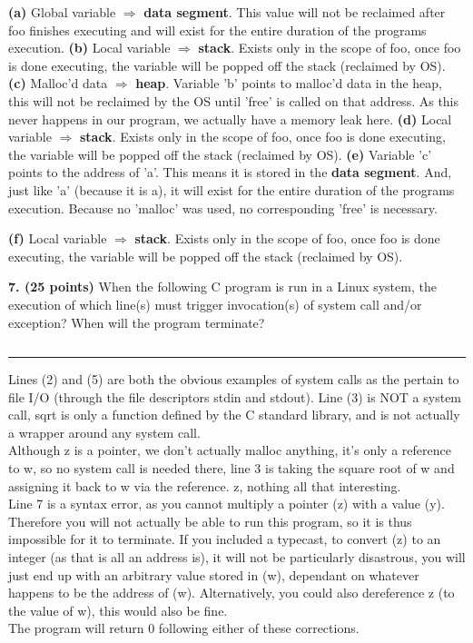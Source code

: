 \documentclass[12pt]{jhwhw}
\begin{document}
	\begin{addmargin}[1em]{}
		\textbf{(a)} Global variable $\Rightarrow$ \textbf{data segment}. This value
			will not be reclaimed after foo finishes executing and will exist
			for the entire duration of the programs execution.
		\bigbreak
		\textbf{(b)} Local variable $\Rightarrow$ \textbf{stack}. Exists only in the scope of
			foo, once foo is done executing, the variable will be popped off the stack
			(reclaimed by OS).
		\bigbreak
		\textbf{(c)} Malloc'd data $\Rightarrow$ \textbf{heap}. Variable 'b' points to malloc'd
			data in the heap, this will not be reclaimed by the OS until 'free' is 
			called on that address. As this never happens in our program, we actually
			have a memory leak here.
		\bigbreak
		\textbf{(d)} Local variable $\Rightarrow$ \textbf{stack}. Exists only in the scope of
			foo, once foo is done executing, the variable will be popped off the stack
			(reclaimed by OS).
		\bigbreak
		\textbf{(e)} Variable 'c' points to the address of 'a'. This means it is 
			stored in the \textbf{data segment}. And, just like 'a' (because it is a),
			it will exist for the entire duration of the programs execution. Because no
			'malloc' was used, no corresponding 'free' is necessary.

		\bigbreak
		\textbf{(f)} Local variable $\Rightarrow$ \textbf{stack}. Exists only in the scope of
			foo, once foo is done executing, the variable will be popped off the stack
			(reclaimed by OS).
	\end{addmargin}

\bigbreak
\textbf{7. (25 points)} When the following C program is run in a Linux system,
the execution of which line(s) must trigger invocation(s) of system call and/or exception?
When will the program terminate?
\inputminted{c}{p7.c}
\textcolor[RGB]{240,240,240}{\rule{\textwidth}{0.5pt}}\bigbreak

	\begin{addmargin}[1em]{}
		Lines (2) and (5) are both the obvious examples of system calls as the
		pertain to file I/O (through the file descriptors stdin and stdout).
		Line (3) is NOT a system call, sqrt is only a function defined by the C standard 
		library, and is not actually a wrapper around any system call. \\ \bigbreak
		Although z is a pointer, we don't actually malloc anything, it's only a reference
		to w, so no system call is needed there, line 3 is taking the square root of w
		and assigning it back to w via the reference. z, nothing all that interesting.
		\\ \bigbreak
		Line 7 is a syntax error, as you cannot multiply a pointer (z) with a value (y).
		Therefore you will not actually be able to run this program, so it is thus impossible 
		for it to terminate. If you included a typecast, to convert (z) to an integer (as
		that is all an address is), it will not be particularly disastrous, you will just
		end up with an arbitrary value stored in (w), dependant on whatever happens
		to be the address of (w). Alternatively, you could also dereference z (to the value
		of w), this would also be fine. \\ \bigbreak
		The program will return 0 following either of these corrections.
	\end{addmargin}
\end{document}
